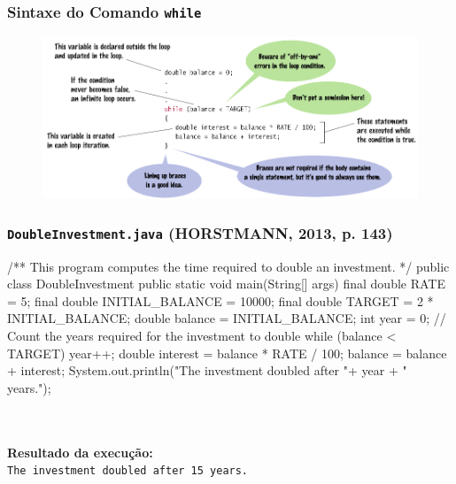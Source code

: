 \documentclass[xcolor={dvipsnames,table},aspectratio=169]{beamer}
\begin{document}
\begin{frame}\frametitle{Sintaxe do Comando \texttt{while}}
\begin{figure}[h]
	\includegraphics[height=0.65\paperheight,center]{pucrs-ep-fprog-unidade_04-lacos-laminas-sintaxe_while.png}
\end{figure}
\end{frame}

\begin{frame}[fragile]\frametitle{\texttt{DoubleInvestment.java} {\tiny (HORSTMANN, 2013, p. 143)}}
{\tiny
\begin{javacode}
/**
   This program computes the time required to double an investment.
*/
public class DoubleInvestment {
   public static void main(String[] args) {
      final double RATE = 5;
      final double INITIAL_BALANCE = 10000;
      final double TARGET = 2 * INITIAL_BALANCE;
      double balance = INITIAL_BALANCE;
      int year = 0;
      // Count the years required for the investment to double
      while (balance < TARGET) {
         year++;
         double interest = balance * RATE / 100;
         balance = balance + interest;
      }
      System.out.println("The investment doubled after "+ year + " years.");
   }
}
\end{javacode}
~\\
~\\
\textbf{Resultado da execução:}\\
\texttt{The investment doubled after 15 years.}
}
\end{frame}
\end{document}
